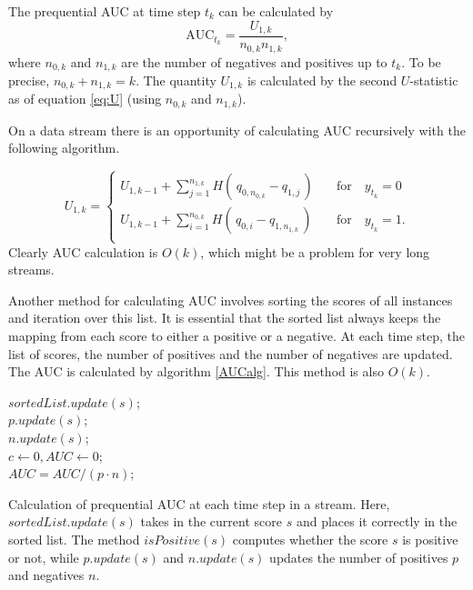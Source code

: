 The prequential AUC at time step $t_k$ can be calculated by
\begin{equation}
\label{eq:prequentialAUC}
\mbox{AUC}_{t_k}= \frac{U_{1,k}}{n_{0,k}n_{1,k}},
\end{equation}
where $n_{0,k}$ and $n_{1,k}$ are the number of negatives and positives up to $t_k$.  To be precise, $n_{0,k} + n_{1,k} = k$.  The quantity $U_{1,k}$ is calculated by the second $U$-statistic as of equation \eqref{eq:U} (using $n_{0,k}$ and $n_{1,k}$).

On a data stream there is an opportunity of calculating AUC recursively with the following algorithm.

\begin{equation}
\label{eq:prequentialAUC2}
U_{1,k}= 
\begin{cases}
U_{1,k-1} + \sum_{j=1}^{n_{1,k}} H( \,q_{0,n_{0,k}} - q_{1,j}    \,)
 \quad &\mbox{for} \quad y_{t_k} = 0\\
U_{1,k-1} + \sum_{i=1}^{n_{0,k}} H( \,q_{0,i} - q_{1,n_{1,k}}    \,)
\quad &\mbox{for} \quad y_{t_k} = 1.\\
\end{cases}
\end{equation}
Clearly AUC calculation is $O(k)$, which might be a problem for very long streams.  

Another method for calculating AUC  involves sorting the scores of all instances and iteration over this list. It is essential that the sorted list always keeps the mapping from each score to either a positive or a negative.  At each time step, the list of scores, the number of positives and the number of negatives are updated.  The AUC is calculated by algorithm \ref{AUCalg}.  This method is also $O(k)$.

\begin{algorithm}[H]
$sortedList.update(s)$;\\
$p.update(s)$;\\
$n.update(s)$;\\
$c \leftarrow 0, AUC \leftarrow 0$;\\
$ AUC = AUC/(p \cdot n)$;
\label{AUCalg}
 \caption{Calculation of prequential AUC at each time step in a stream.  Here, $sortedList.update(s)$ takes in the current score $s$ and places it correctly in the sorted list. The method $isPositive(s)$ computes whether the score $s$ is positive or not, while $p.update(s)$ and $n.update(s)$ updates the number of positives $p$ and negatives $n$.}
\end{algorithm}

